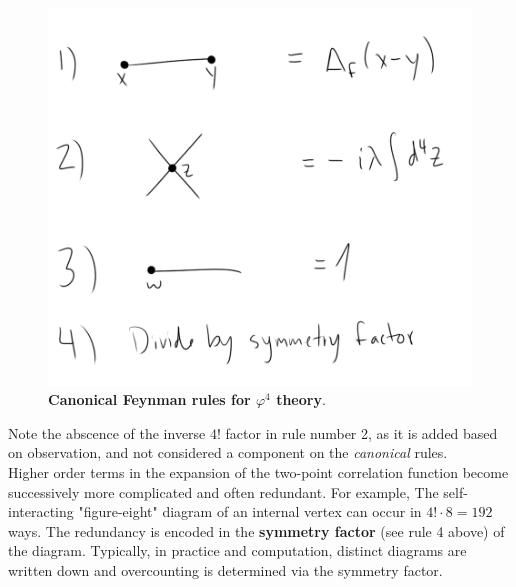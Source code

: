 \begin{figure}[H]
	\centering
	\includegraphics[scale=0.5]{phi4rules.png}
	\caption{\textbf{Canonical Feynman rules for $\varphi^4$ theory}.}
\end{figure}

\noindent Note the abscence of the inverse $4!$ factor in rule number 2, as it is added based on observation, and not considered a component on the \textit{canonical} rules. \\

\noindent Higher order terms in the expansion of the two-point correlation function become successively more complicated and often redundant. For example, The self-interacting "figure-eight" diagram of an internal vertex can occur in $4!\cdot8=192$ ways. The redundancy is encoded in the \textbf{symmetry factor} (see rule 4 above) of the diagram. Typically, in practice and computation, distinct diagrams are written down and overcounting is determined via the symmetry factor.